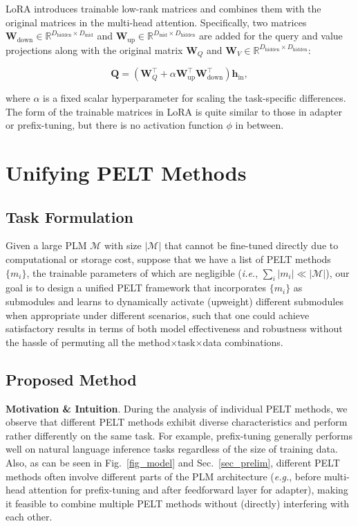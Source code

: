 LoRA introduces trainable low-rank matrices and combines them with the original matrices in the multi-head attention. Specifically, two matrices ${\bm{W}}_{\text{down}} \in {\mathbb{R}}^{D_{\text{hidden}} \times D_{\text{mid}}}$ and ${\bm{W}}_{\text{up}} \in {\mathbb{R}}^{D_{\text{mid}} \times  D_{\text{hidden}}}$ are added for the query and value projections along with the original matrix  ${\bm{W}}_Q$ and ${\bm{W}}_V \in {\mathbb{R}}^{D_{\text{hidden}} \times D_{\text{hidden}}}$:

\begin{equation}
    {\bm{Q}} = ({\bm{W}}_Q^\intercal + \alpha {\bm{W}}_{\text{up}}^\intercal {\bm{W}}_{\text{down}}^\intercal) {\bm{h}}_{\text{in}},
\end{equation}

where $\alpha$ is a fixed scalar hyperparameter for scaling the task-specific differences. The form of the trainable matrices in LoRA is quite similar to those in adapter or prefix-tuning, but there is no activation function $\phi$ in between.

\section{Unifying PELT Methods}
\subsection{Task Formulation} Given a large PLM ${\mathcal{M}}$ with size $|{\mathcal{M}}|$ that cannot be fine-tuned directly due to computational or storage cost, suppose that we have a list of PELT methods $\{m_i\}$, the trainable parameters of which are negligible (\textit{i.e.}, $\sum_i{|m_i|} \ll |{\mathcal{M}}|$), our goal is to design a unified PELT framework that incorporates $\{m_i\}$ as submodules and learns to dynamically activate (upweight) different submodules when appropriate under different scenarios, such that one could achieve satisfactory results in terms of both model effectiveness and robustness without the hassle of permuting all the method$\times$task$\times$data combinations.

\subsection{Proposed Method}
{{\bf Motivation \& Intuition}.} During the analysis of individual PELT methods, we observe that different PELT methods exhibit diverse characteristics and perform rather differently on the same task. For example, prefix-tuning generally performs well on natural language inference tasks regardless of the size of training data. Also, as can be seen in Fig.~\ref{fig_model} and Sec.~\ref{sec_prelim}, different PELT methods often involve different parts of the PLM architecture (\textit{e.g.}, before multi-head attention for prefix-tuning and after feedforward layer for adapter), making it feasible to combine multiple PELT methods without (directly) interfering with each other.

